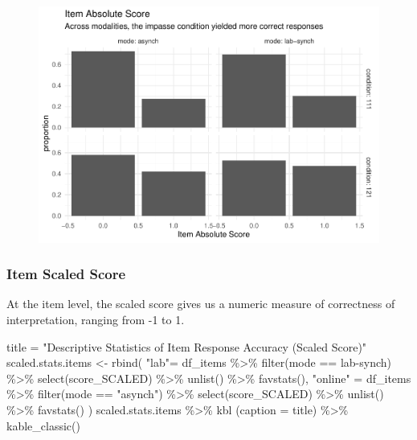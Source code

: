 \documentclass[
  letterpaper,
  DIV=11,
  numbers=noendperiod]{scrreprt}
\newenvironment{Shaded}{\begin{snugshade}}{\end{snugshade}}
\newcommand{\AttributeTok}[1]{\textcolor[rgb]{0.40,0.45,0.13}{#1}}
\newcommand{\FunctionTok}[1]{\textcolor[rgb]{0.28,0.35,0.67}{#1}}
\newcommand{\NormalTok}[1]{\textcolor[rgb]{0.00,0.23,0.31}{#1}}
\newcommand{\OtherTok}[1]{\textcolor[rgb]{0.00,0.23,0.31}{#1}}
\newcommand{\SpecialCharTok}[1]{\textcolor[rgb]{0.37,0.37,0.37}{#1}}
\newcommand{\StringTok}[1]{\textcolor[rgb]{0.13,0.47,0.30}{#1}}
\begin{document}
\begin{figure}[H]

{\centering \includegraphics{analysis/SGC3A/3_sgc3A_description_files/figure-pdf/VIS-ITEM-ABS-1.pdf}

}

\end{figure}

\hypertarget{item-scaled-score}{%
\subsubsection{Item Scaled Score}\label{item-scaled-score}}

At the item level, the scaled score gives us a numeric measure of
correctness of interpretation, ranging from -1 to 1.

\begin{Shaded}
\begin{Highlighting}[]
\NormalTok{title }\OtherTok{=} \StringTok{"Descriptive Statistics of Item Response Accuracy (Scaled Score)"}
\NormalTok{scaled.stats.items }\OtherTok{\textless{}{-}} \FunctionTok{rbind}\NormalTok{(}
  \StringTok{"lab"}\OtherTok{=}\NormalTok{ df\_items }\SpecialCharTok{\%\textgreater{}\%} \FunctionTok{filter}\NormalTok{(mode }\SpecialCharTok{==} \StringTok{\textquotesingle{}lab{-}synch\textquotesingle{}}\NormalTok{) }\SpecialCharTok{\%\textgreater{}\%} \FunctionTok{select}\NormalTok{(score\_SCALED) }\SpecialCharTok{\%\textgreater{}\%} \FunctionTok{unlist}\NormalTok{() }\SpecialCharTok{\%\textgreater{}\%} \FunctionTok{favstats}\NormalTok{(),}
  \StringTok{"online"} \OtherTok{=}\NormalTok{ df\_items }\SpecialCharTok{\%\textgreater{}\%} \FunctionTok{filter}\NormalTok{(mode }\SpecialCharTok{==} \StringTok{"asynch"}\NormalTok{) }\SpecialCharTok{\%\textgreater{}\%} \FunctionTok{select}\NormalTok{(score\_SCALED) }\SpecialCharTok{\%\textgreater{}\%} \FunctionTok{unlist}\NormalTok{() }\SpecialCharTok{\%\textgreater{}\%} \FunctionTok{favstats}\NormalTok{()}
\NormalTok{) }
\NormalTok{scaled.stats.items }\SpecialCharTok{\%\textgreater{}\%} \FunctionTok{kbl}\NormalTok{ (}\AttributeTok{caption =}\NormalTok{ title) }\SpecialCharTok{\%\textgreater{}\%} \FunctionTok{kable\_classic}\NormalTok{()}
\end{Highlighting}
\end{Shaded}
\end{document}
